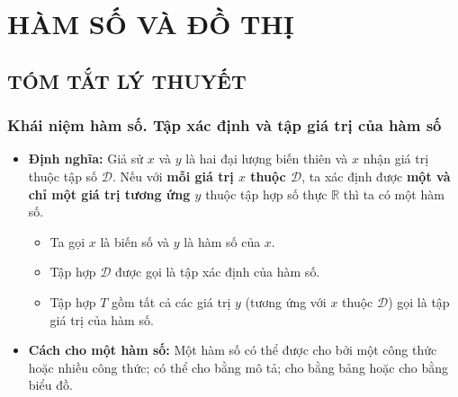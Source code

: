 \setcounter{section}{0}
\section{HÀM SỐ VÀ ĐỒ THỊ}
\subsection{TÓM TẮT LÝ THUYẾT}
\subsubsection{Khái niệm hàm số. Tập xác định và tập giá trị của hàm số}
\begin{itemize}
	\item [\faSunO] \textbf{Định nghĩa:} Giả sử $x$ và $y$ là hai đại lượng biến thiên và $x$ nhận giá trị thuộc tập số $\mathscr{D}$.	Nếu với \textbf{mỗi giá trị $x$ thuộc $\mathscr{D}$}, ta xác định được \textbf{một và chỉ một giá trị tương ứng $y$} thuộc tập hợp số thực $\mathbb{R}$ thì ta có một hàm số.
	\begin{khung}
		\begin{itemize}
			\item Ta gọi $x$ là biến số và $y$ là hàm số của $x$.
			\item Tập hợp $\mathscr{D}$ được gọi là tập xác định của hàm số.
			\item Tập hợp $T$ gồm tất cả các giá trị $y$ (tương ứng với $x$ thuộc $\mathscr{D}$) gọi là tập giá trị của hàm số.
		\end{itemize}
	\end{khung}
	\item [\faSunO] \textbf{Cách cho một hàm số:} Một hàm số có thể được cho bởi một công thức hoặc nhiều công thức; có thể cho bằng mô tả; cho bằng bảng hoặc cho bằng biểu đồ.
\end{itemize}
